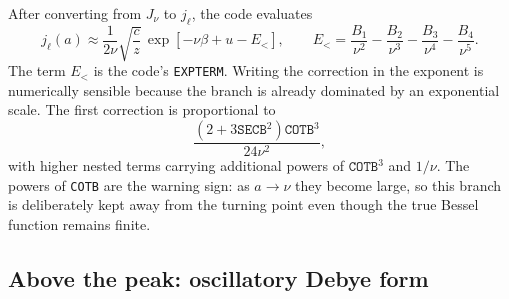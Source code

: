 \documentclass[11pt,a4paper]{article}
\newcommand{\code}[1]{\texttt{#1}}
\begin{document}
After converting from $J_\nu$ to $j_\ell$, the code evaluates
\begin{equation}
  j_\ell(a) \approx \frac{1}{2\nu}\sqrt{\frac{c}{z}}\,
  \exp\left[-\nu\beta+u-E_{<}\right],
  \qquad
  E_{<}=\frac{B_1}{\nu^2}-\frac{B_2}{\nu^3}
        -\frac{B_3}{\nu^4}-\frac{B_4}{\nu^5}.
  \label{eq:below-debye-code}
\end{equation}
The term $E_{<}$ is the code's \code{EXPTERM}.  Writing the correction in the
exponent is numerically sensible because the branch is already dominated by an
exponential scale.  The first correction is proportional to
\begin{equation}
  \frac{(2+3\code{SECB}^2)\code{COTB}^3}{24\nu^2},
\end{equation}
with higher nested terms carrying additional powers of $\code{COTB}^3$ and $1/\nu$.  The powers of \code{COTB} are the warning sign: as $a\to\nu$ they become large, so this branch is deliberately kept away from the turning point even though the true Bessel function remains finite.

\subsection{Above the peak: oscillatory Debye form}
\end{document}
